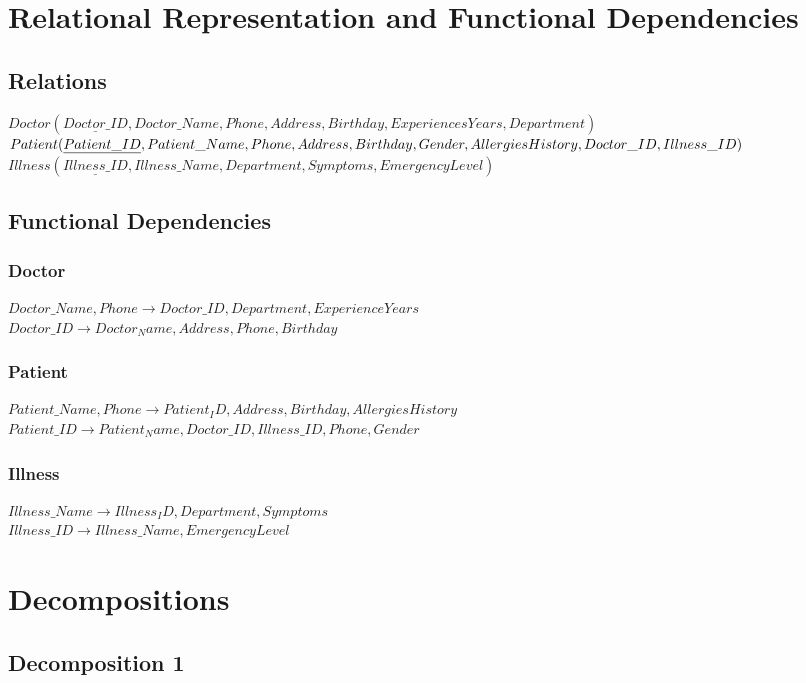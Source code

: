 \documentclass[12pt,arial]{article}
\begin{document}
\section{Relational Representation and Functional Dependencies}
\subsection{Relations}
$Doctor (\underline{Doctor\_ID}, Doctor\_Name, Phone, Address, Birthday, Experiences Years, Department) $\\
$Patient (\underline{Patient\_ID}, Patient\_Name, Phone, Address, Birthday, \\ Gender, Allergies History, Doctor\_ID, Illness\_ID) $\\
$Illness (\underline{Illness\_ID}, Illness\_Name, Department, Symptoms, Emergency Level) $\\
\subsection{Functional Dependencies}
\subsubsection{Doctor}
$Doctor\_Name, Phone \rightarrow Doctor\_ID, Department,Experience Years $\\
$Doctor\_ID \rightarrow Doctor_Name, Address, Phone, Birthday$
\subsubsection{Patient}
$ Patient\_Name, Phone \rightarrow Patient_ID,Address, Birthday, Allergies History $\\
 $Patient\_ID \rightarrow Patient_Name,Doctor\_ID,Illness\_ID,Phone,Gender$
\subsubsection{Illness}
$Illness\_Name \rightarrow Illness_ID, Department, Symptoms$\\
$Illness\_ID \rightarrow Illness\_Name, Emergency Level$


\section{Decompositions}
\subsection{Decomposition 1}
\end{document}
